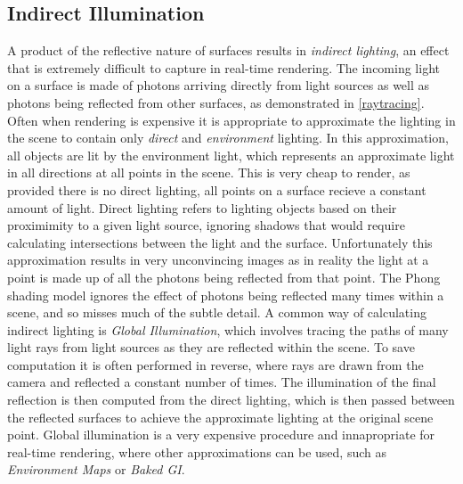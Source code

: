 \documentclass[ %
                    author={Gavin Parker},
                supervisor={Dr. Neill Campbell},
                    degree={MEng},
                     title={Deep Siamese Networks for Illumination Estimation from Stereo Images},
                  subtitle={},
                      type={research},
                      year={2018} ]{dissertation}
\begin{document}
\subsection{Indirect Illumination}
A product of the reflective nature of surfaces results in \textit{indirect lighting}, an effect that is extremely difficult to capture in real-time rendering. The incoming light on a surface is made of photons arriving directly from light sources as well as photons being reflected from other surfaces, as demonstrated in \ref{raytracing}. Often when rendering is expensive it is appropriate to approximate the lighting in the scene to contain only \textit{direct} and \textit{environment} lighting. In this approximation, all objects are lit by the environment light, which represents an approximate light in all directions at all points in the scene. This is very cheap to render, as provided there is no direct lighting, all points on a surface recieve a constant amount of light. Direct lighting refers to lighting objects based on their proximimity to a given light source, ignoring shadows that would require calculating intersections between the light and the surface. Unfortunately this approximation results in very unconvincing images as in reality the light at a point is made up of all the photons being reflected from that point. The Phong shading model ignores the effect of photons being reflected many times within a scene, and so misses much of the subtle detail. A common way of calculating indirect lighting is \textit{Global Illumination}, which involves tracing the paths of many light rays from light sources as they are reflected within the scene. To save computation it is often performed in reverse, where rays are drawn from the camera and reflected a constant number of times. The illumination of the final reflection is then computed from the direct lighting, which is then passed between the reflected surfaces to achieve the approximate lighting at the original scene point. Global illumination is a very expensive procedure and innapropriate for real-time rendering, where other approximations can be used, such as \textit{Environment Maps} or \textit{Baked GI}.
\end{document}
